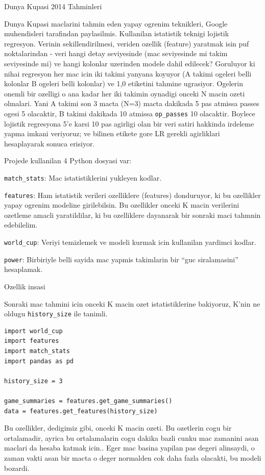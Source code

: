 \documentclass[12pt,fleqn]{article}\usepackage{../common}
\begin{document}
Dunya Kupasi 2014 Tahminleri

Dunya Kupasi maclarini tahmin eden yapay ogrenim teknikleri, Google
muhendisleri tarafindan paylasilmis. Kullanilan istatistik teknigi lojistik
regresyon. Verinin sekillendirilmesi, veriden ozellik (feature) yaratmak
isin puf noktalarindan - veri hangi detay seviyesinde (mac seviyesinde mi
takim seviyesinde mi) ve hangi kolonlar uzerinden modele dahil edilecek?
Goruluyor ki nihai regresyon her mac icin iki takimi yanyana koyuyor (A
takimi ogeleri belli kolonlar B ogeleri belli kolonlar) ve 1,0 etiketini
tahmine ugrasiyor. Ogelerin onemli bir ozelligi o ana kadar her iki takimin
oynadigi onceki N macin ozeti olmalari. Yani A takimi son 3 macta (N=3)
macta dakikada 5 pas atmissa passes ogesi 5 olacaktir, B takimi dakikada 10
atmissa \verb!op_passes! 10 olacaktir. Boylece lojistik regresyona 5'e
karsi 10 pas agirligi olan bir veri satiri hakkinda irdeleme yapma imkani
veriyoruz; ve bilinen etikete gore LR gerekli agirliklari hesaplayarak
sonuca erisiyor.

Projede kullanilan 4 Python dosyasi var: 

\verb!match_stats!: Mac istatistiklerini yukleyen kodlar.

\verb!features!: Ham istatistik verileri ozelliklere (features) donduruyor,
ki bu ozellikler yapay ogrenim modeline girilebilsin. Bu ozellikler onceki
K macin verilerini ozetleme amacli yaratildilar, ki bu ozelliklere
dayanarak bir sonraki maci tahmnin edebilelim.

\verb!world_cup!: Veriyi temizlemek ve modeli kurmak icin kullanilan
yardimci kodlar.

\verb!power!: Birbiriyle belli sayida mac yapmis takimlarin bir ``guc
siralamasini'' hesaplamak. 

Ozellik insasi

Sonraki mac tahmini icin onceki K macin ozet istatistiklerine bakiyoruz, K'nin
ne oldugu \verb!history_size! ile tanimli.

\begin{verbatim}
import world_cup
import features
import match_stats
import pandas as pd

history_size = 3

game_summaries = features.get_game_summaries()
data = features.get_features(history_size)
\end{verbatim}

Bu ozellikler, dedigimiz gibi, onceki K macin ozeti. Bu ozetlerin cogu bir
ortalamadir, ayrica bu ortalamalarin cogu dakika bazli cunku mac zamanini
asan maclari da hesaba katmak icin.. Eger mac basina yapilan pas degeri
alinsaydi, o zaman vakti asan bir macta o deger normalden cok daha fazla
olacakti, bu modeli bozardi.
\end{document}
